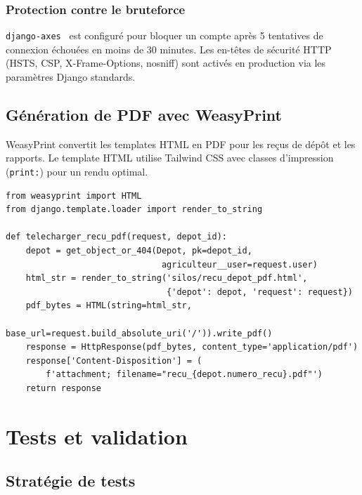 \documentclass[12pt,a4paper,twoside]{report}
\begin{document}
\subsection{Protection contre le bruteforce}

\texttt{django-axes}~\cite{owasp2021top10} est configuré pour bloquer un
compte après 5 tentatives de connexion échouées en moins de 30 minutes.
Les en-têtes de sécurité HTTP (HSTS, CSP, X-Frame-Options, nosniff) sont
activés en production via les paramètres Django standards.

\section{Génération de PDF avec WeasyPrint}

WeasyPrint convertit les templates HTML en PDF pour les reçus de dépôt
et les rapports. Le template HTML utilise Tailwind CSS avec classes d'impression
(\texttt{print:}) pour un rendu optimal.

\begin{lstlisting}[style=pythonstyle, caption={Vue de génération de reçu PDF}]
from weasyprint import HTML
from django.template.loader import render_to_string

def telecharger_recu_pdf(request, depot_id):
    depot = get_object_or_404(Depot, pk=depot_id,
                               agriculteur__user=request.user)
    html_str = render_to_string('silos/recu_depot_pdf.html',
                                {'depot': depot, 'request': request})
    pdf_bytes = HTML(string=html_str,
                     base_url=request.build_absolute_uri('/')).write_pdf()
    response = HttpResponse(pdf_bytes, content_type='application/pdf')
    response['Content-Disposition'] = (
        f'attachment; filename="recu_{depot.numero_recu}.pdf"')
    return response
\end{lstlisting}

\chapter{Tests et validation}

\section{Stratégie de tests}
\end{document}
